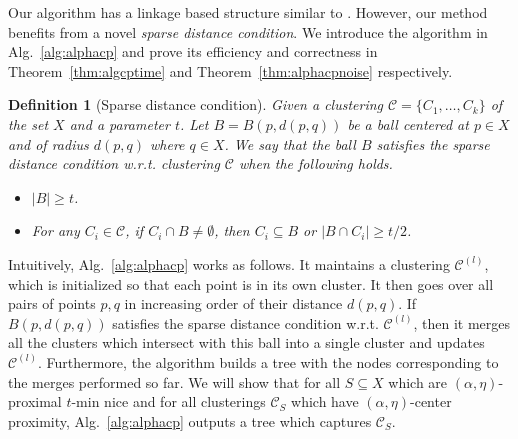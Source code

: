\documentclass[12pt]{article}
\newtheorem{definition}[theorem]{Definition}
\newcommand{\mc}{\mathcal}
\begin{document}
Our algorithm has a linkage based structure similar to \cite{balcan2012clustering}. However, our method benefits from a novel {\it sparse distance condition}. We introduce the algorithm in Alg.~\ref{alg:alphacp} and prove its efficiency and correctness in Theorem~\ref{thm:algcptime} and Theorem~\ref{thm:alphacpnoise} respectively. 

\begin{definition}[Sparse distance condition]
	 Given a clustering $\mc C = \{C_1,\ldots,C_k\}$ of the set $X$ and a parameter $t$. Let $B = B(p, d(p, q))$ be a ball centered at $p \in X$ and of radius $d(p, q)$ where $q \in X$. We say that the ball $B$ satisfies the sparse distance condition w.r.t. clustering $\mc C$ when the following holds.
\begin{itemize}[noitemsep,nolistsep,leftmargin=*]
\item $|B| \ge t$.
\item For any $C_i \in \mc C$, if $C_i \cap B \neq \emptyset$, then $C_i \subseteq B$ or $|B \cap C_i| \ge t/2$.
\end{itemize}
\end{definition}

Intuitively, Alg.~\ref{alg:alphacp} works as follows. It maintains a clustering $\mc C^{(l)}$, which is initialized so that each point is in its own cluster. It then goes over all pairs of points $p, q$ in increasing order of their distance $d(p, q)$. If $B(p, d(p,q))$ satisfies the sparse distance condition w.r.t. $\mc C^{(l)}$, then it merges all the clusters which intersect with this ball into a single cluster and updates $\mc C^{(l)}$. Furthermore, the algorithm builds a tree with the nodes corresponding to the merges performed so far. We will show that for all $S \subseteq X$ which are $(\alpha, \eta)$-proximal $t$-min nice and for all clusterings $\mc C_S$ which have $(\alpha, \eta)$-center proximity, Alg.~\ref{alg:alphacp} outputs a tree which captures $\mc C_S$.

\SetAlgoNoLine
\LinesNumbered
\SetNlSkip{-0.4em}
\end{document}
